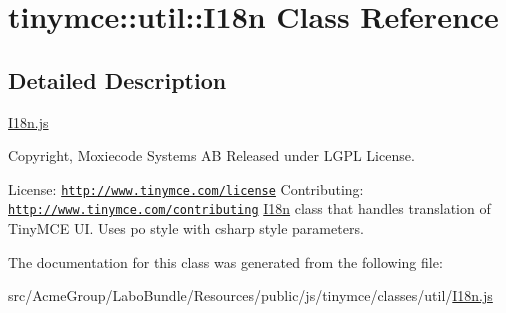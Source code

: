 \hypertarget{classtinymce_1_1util_1_1_i18n}{\section{tinymce\+:\+:util\+:\+:I18n Class Reference}
\label{classtinymce_1_1util_1_1_i18n}
}


\subsection{Detailed Description}
\hyperlink{_i18n_8js}{I18n.\+js}

Copyright, Moxiecode Systems A\+B Released under L\+G\+P\+L License.

License\+: \href{http://www.tinymce.com/license}{\tt http\+://www.\+tinymce.\+com/license} Contributing\+: \href{http://www.tinymce.com/contributing}{\tt http\+://www.\+tinymce.\+com/contributing} \hyperlink{classtinymce_1_1util_1_1_i18n}{I18n} class that handles translation of Tiny\+M\+C\+E U\+I. Uses po style with csharp style parameters. 

The documentation for this class was generated from the following file\+:\begin{DoxyCompactItemize}
\item 
src/\+Acme\+Group/\+Labo\+Bundle/\+Resources/public/js/tinymce/classes/util/\hyperlink{_i18n_8js}{I18n.\+js}\end{DoxyCompactItemize}

